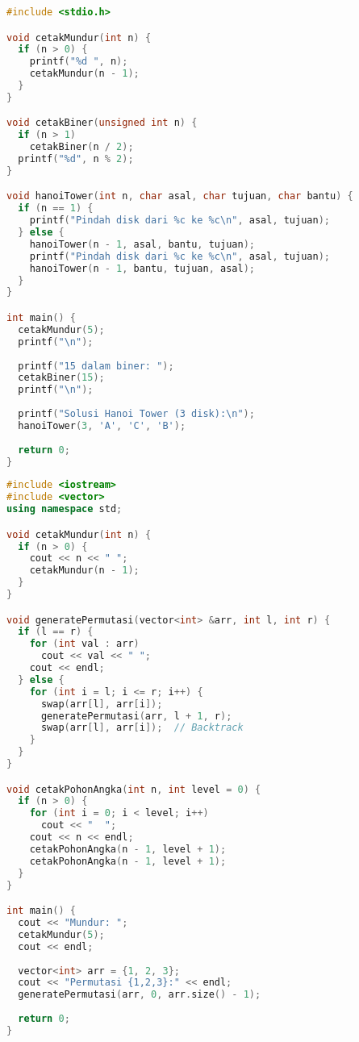 \documentclass[../main.tex]{subfiles}
\begin{document}
\begin{lstlisting}[language=C, caption={Prosedur rekursif (C)}]
#include <stdio.h>

void cetakMundur(int n) {
  if (n > 0) {
    printf("%d ", n);
    cetakMundur(n - 1);
  }
}

void cetakBiner(unsigned int n) {
  if (n > 1)
    cetakBiner(n / 2);
  printf("%d", n % 2);
}

void hanoiTower(int n, char asal, char tujuan, char bantu) {
  if (n == 1) {
    printf("Pindah disk dari %c ke %c\n", asal, tujuan);
  } else {
    hanoiTower(n - 1, asal, bantu, tujuan);
    printf("Pindah disk dari %c ke %c\n", asal, tujuan);
    hanoiTower(n - 1, bantu, tujuan, asal);
  }
}

int main() {
  cetakMundur(5);
  printf("\n");
  
  printf("15 dalam biner: ");
  cetakBiner(15);
  printf("\n");
  
  printf("Solusi Hanoi Tower (3 disk):\n");
  hanoiTower(3, 'A', 'C', 'B');
  
  return 0;
}
\end{lstlisting}

\begin{lstlisting}[language=C++, caption={Prosedur rekursif (C++)}]
#include <iostream>
#include <vector>
using namespace std;

void cetakMundur(int n) {
  if (n > 0) {
    cout << n << " ";
    cetakMundur(n - 1);
  }
}

void generatePermutasi(vector<int> &arr, int l, int r) {
  if (l == r) {
    for (int val : arr)
      cout << val << " ";
    cout << endl;
  } else {
    for (int i = l; i <= r; i++) {
      swap(arr[l], arr[i]);
      generatePermutasi(arr, l + 1, r);
      swap(arr[l], arr[i]);  // Backtrack
    }
  }
}

void cetakPohonAngka(int n, int level = 0) {
  if (n > 0) {
    for (int i = 0; i < level; i++)
      cout << "  ";
    cout << n << endl;
    cetakPohonAngka(n - 1, level + 1);
    cetakPohonAngka(n - 1, level + 1);
  }
}

int main() {
  cout << "Mundur: ";
  cetakMundur(5);
  cout << endl;
  
  vector<int> arr = {1, 2, 3};
  cout << "Permutasi {1,2,3}:" << endl;
  generatePermutasi(arr, 0, arr.size() - 1);
  
  return 0;
}
\end{lstlisting}
\end{document}
